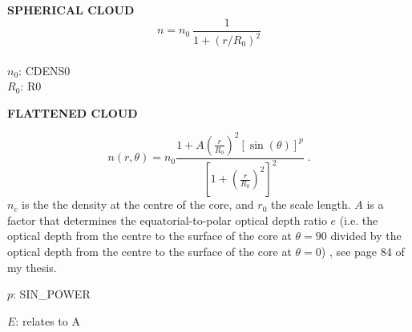 \documentclass[12pt,a4paper]{article}
\begin{document}
\newpage

{\bf SPHERICAL CLOUD}
\begin{equation}
n=n_0\ \frac{1}{1+(r/R_0)^2}
\end{equation}
\\
$n_0$: CDENS0
\\
$R_0$: R0
\vspace{.3cm}

{\bf FLATTENED CLOUD}

\begin{equation}
\label{eq:disk.core}
n(r,\theta)=n_0\frac{1+A\left(\frac{r}{R_0}\right)^2
\left[\sin(\theta)\right]^p}{\left[1+\left(\frac{r}{R_0}\right)^2\right]^2}\;.
\end{equation}
$n_c$ is the the density at the centre of the core,  and $r_0$ the scale
length. $A$ is a factor that determines the equatorial-to-polar  optical
depth ratio $e$ (i.e. the optical depth from the
centre to the surface of the core at $\theta=90$
divided by the optical depth from the centre to the surface of the core at $\theta=0$) , see page 84 of my thesis.

\vspace{0.3cm}
$p$: SIN\_POWER

$E$: relates to A
\end{document}
